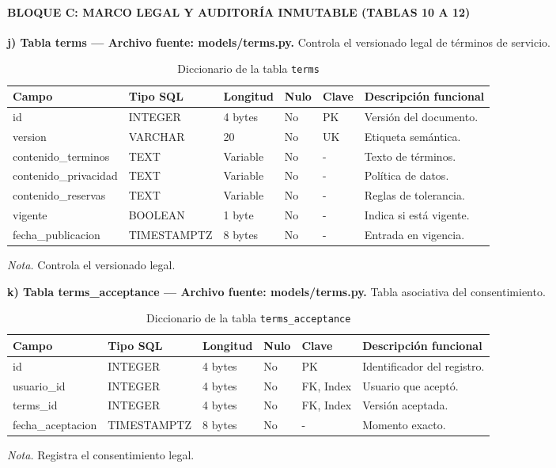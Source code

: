 \paragraph{BLOQUE C: MARCO LEGAL Y AUDITORÍA INMUTABLE (TABLAS 10 A 12)}

\textbf{j) Tabla terms — Archivo fuente: models/terms.py.} Controla el versionado legal de términos de servicio.

\begin{table}[htbp]
\caption{Diccionario de la tabla \texttt{terms}}
\label{tab:dict_terms}
\begin{tabular}{@{}p{5cm} p{3cm} p{1.5cm} p{1cm} p{1.5cm} p{3.5cm}@{}}
\toprule
\textbf{Campo} & \textbf{Tipo SQL} & \textbf{Longitud} & \textbf{Nulo} & \textbf{Clave} & \textbf{Descripción funcional} \\
\midrule
id & INTEGER & 4 bytes & No & PK & Versión del documento. \\
version & VARCHAR & 20 & No & UK & Etiqueta semántica. \\
contenido\_terminos & TEXT & Variable & No & - & Texto de términos. \\
contenido\_privacidad & TEXT & Variable & No & - & Política de datos. \\
contenido\_reservas & TEXT & Variable & No & - & Reglas de tolerancia. \\
vigente & BOOLEAN & 1 byte & No & - & Indica si está vigente. \\
fecha\_publicacion & TIMESTAMPTZ & 8 bytes & No & - & Entrada en vigencia. \\
\bottomrule
\end{tabular}
\par\vspace{0.2cm}
\textit{Nota.} Controla el versionado legal.
\end{table}

\textbf{k) Tabla terms\_acceptance — Archivo fuente: models/terms.py.} Tabla asociativa del consentimiento.

\begin{table}[htbp]
\caption{Diccionario de la tabla \texttt{terms\_acceptance}}
\label{tab:dict_terms_acceptance}
\begin{tabular}{@{}p{5cm} p{3cm} p{1.5cm} p{1cm} p{1.5cm} p{3.5cm}@{}}
\toprule
\textbf{Campo} & \textbf{Tipo SQL} & \textbf{Longitud} & \textbf{Nulo} & \textbf{Clave} & \textbf{Descripción funcional} \\
\midrule
id & INTEGER & 4 bytes & No & PK & Identificador del registro. \\
usuario\_id & INTEGER & 4 bytes & No & FK, Index & Usuario que aceptó. \\
terms\_id & INTEGER & 4 bytes & No & FK, Index & Versión aceptada. \\
fecha\_aceptacion & TIMESTAMPTZ & 8 bytes & No & - & Momento exacto. \\
\bottomrule
\end{tabular}
\par\vspace{0.2cm}
\textit{Nota.} Registra el consentimiento legal.
\end{table}

